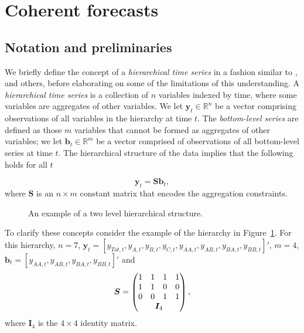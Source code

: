 \documentclass[12pt]{article}
\theoremstyle{definition}
\theoremstyle{property}
\begin{document}
\section{Coherent forecasts}\label{sec:CoheForecasts}
	
	\subsection{Notation and preliminaries}\label{sec:notation}
	
    We briefly define the concept of a \emph{hierarchical time series} in a fashion similar to \cite{WicEtAl2019}, \cite{FPP2018} and others, before elaborating on some of the limitations of this understanding.  A \emph{hierarchical time series} is a collection of $n$ variables indexed by time, where some variables are aggregates of other variables. We let $\bm{y}_t \in \mathbb{R}^n$ be a vector comprising observations of all variables in the hierarchy at time $t$. The \emph{bottom-level series} are defined as those $m$ variables that cannot be formed as aggregates of other variables; we let $\bm{b}_t \in \mathbb{R}^m$ be a vector comprised of observations of all bottom-level series at time $t$.  The hierarchical structure of the data implies that the following holds for all $t$
    
    \begin{equation}
    \bm{y}_t = \bm{Sb}_t,
    \end{equation}
    where $\bm{S}$ is an $n \times m$ constant matrix that encodes the aggregation constraints.  
	
		\begin{figure}[H]
			\begin{center}
				 
				 
				\qobitree
			\end{center}
			\caption{An example of a two level hierarchical structure.}\label{fig:basichier}
		\end{figure}
	
	To clarify these concepts consider the example of the hierarchy in Figure~\ref{fig:basichier}.  For this hierarchy, $n=7$, $\bm{y}_t = [y_{Tot,t},y_{A,t}, y_{B,t},y_{C,t},y_{AA,t}, y_{AB,t}, y_{BA,t}, y_{BB,t}]'$, $m=4$, $\bm{b}_t = [y_{AA,t}, y_{AB,t}, y_{BA,t}, y_{BB,t}]'$ and
	\[
	\bm{S} = \begin{pmatrix}
	1 & 1 & 1 & 1  \\
	1 & 1 & 0 & 0 \\
	0 & 0 & 1 & 1 \\
	& \multicolumn{2}{c}{\bm{I}_4} &
	\end{pmatrix},
	\]
	where $\bm{I}_4$ is the $4\times 4$ identity matrix.
	
\end{document}
